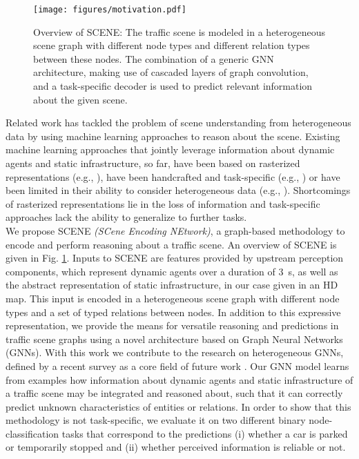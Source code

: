 \documentclass[letterpaper, 10 pt, journal, twoside]{IEEEtran}
\begin{document}
\begin{figure}[tpb]
	\vspace{0.06cm} \centering
	\texttt{[image: figures/motivation.pdf]}
	\caption{Overview of SCENE: The traffic scene is modeled in a heterogeneous scene graph with different node types and different relation types between these nodes. The combination of a generic GNN architecture, making use of cascaded layers of graph convolution, and a task-specific decoder is used to predict relevant information about the given scene.}
	\label{fig:motivation}
\end{figure}

Related work has tackled the problem of scene understanding from heterogeneous data by using machine learning approaches to reason about the scene.
Existing machine learning approaches that jointly leverage information about dynamic agents and static infrastructure, so far, have been based on rasterized representations (e.g., \cite{Hong2019}), have been handcrafted and task-specific (e.g., \cite{Behrendt2019}) or have been limited in their ability to consider heterogeneous data (e.g., \cite{Liang2020}).
Shortcomings of rasterized representations lie in the loss of information and task-specific approaches lack the ability to generalize to further tasks.\\

We propose SCENE \textit{(SCene Encoding NEtwork)}, a graph-based methodology to encode and perform reasoning about a traffic scene.
An overview of SCENE is given in Fig. \ref{fig:motivation}.
Inputs to SCENE are features provided by upstream perception components, which represent dynamic agents over a duration of \SI{3}{s}, as well as the abstract representation of static infrastructure, in our case given in an HD map.
This input is encoded in a heterogeneous scene graph with different node types and a set of typed relations between nodes.
In addition to this expressive representation, we provide the means for versatile reasoning and predictions in traffic scene graphs using a novel architecture based on Graph Neural Networks (GNNs).
With this work we contribute to the research on heterogeneous GNNs, defined by a recent survey as a core field of future work \cite{Wu2021}.
Our GNN model learns from examples how information about dynamic agents and static infrastructure of a traffic scene may be integrated and reasoned about, such that it can correctly predict unknown characteristics of entities or relations.
In order to show that this methodology is not task-specific, we evaluate it on two different binary node-classification tasks that correspond to the predictions (i) whether a car is parked or temporarily stopped and (ii) whether perceived information is reliable or not.
\end{document}
